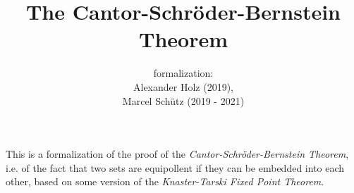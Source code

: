\documentclass{article}
\title{The Cantor-Schröder-Bernstein Theorem}
\author{\Naproche formalization: \vspace{0.5em} \\
Alexander Holz (2019), \\
Marcel Schütz (2019 - 2021)}
\date{}
\begin{document}

  \maketitle

  This is a formalization of the proof of the \textit{Cantor-Schröder-Bernstein
  Theorem}, i.e. of the fact that two sets are equipollent if they can be
  embedded into each other, based on some version of the \textit{Knaster-Tarski
  Fixed Point Theorem}.

  \begin{forthel}
  \end{forthel}

  \begin{forthel}
  \end{forthel}
\end{document}
